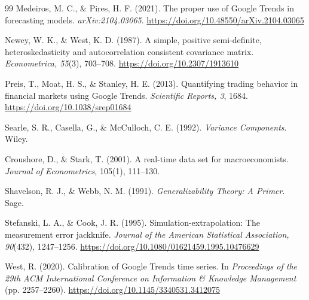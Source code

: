 \documentclass[12pt,a4paper,oneside]{article}
\begin{document}
\begin{thebibliography}{99}
Medeiros, M. C., \& Pires, H. F. (2021).
The proper use of Google Trends in forecasting models.
\textit{arXiv:2104.03065}.
\url{https://doi.org/10.48550/arXiv.2104.03065}

Newey, W. K., \& West, K. D. (1987).
A simple, positive semi-definite, heteroskedasticity and autocorrelation consistent covariance matrix.
\textit{Econometrica, 55}(3), 703--708.
\url{https://doi.org/10.2307/1913610}

Preis, T., Moat, H. S., \& Stanley, H. E. (2013).
Quantifying trading behavior in financial markets using Google Trends.
\textit{Scientific Reports, 3}, 1684.
\url{https://doi.org/10.1038/srep01684}

Searle, S. R., Casella, G., \& McCulloch, C. E. (1992).
\textit{Variance Components}.
Wiley.

Croushore, D., \& Stark, T. (2001).
A real-time data set for macroeconomists.
\textit{Journal of Econometrics}, 105(1), 111--130.

Shavelson, R. J., \& Webb, N. M. (1991).
\textit{Generalizability Theory: A Primer}.
Sage.

Stefanski, L. A., \& Cook, J. R. (1995).
Simulation-extrapolation: The measurement error jackknife.
\textit{Journal of the American Statistical Association, 90}(432), 1247--1256.
\url{https://doi.org/10.1080/01621459.1995.10476629}

West, R. (2020).
Calibration of Google Trends time series.
In \textit{Proceedings of the 29th ACM International Conference on Information \& Knowledge Management} (pp. 2257--2260).
\url{https://doi.org/10.1145/3340531.3412075}

\end{thebibliography}
\end{document}
